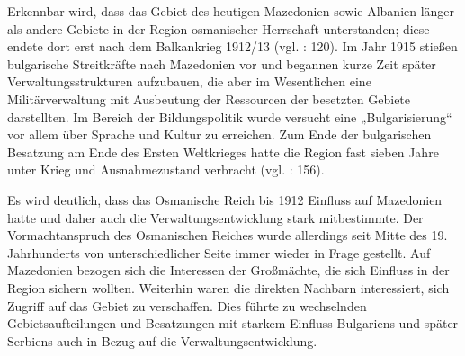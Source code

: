  Erkennbar wird, dass das Gebiet des heutigen Mazedonien sowie Albanien länger als andere Gebiete in der Region osmanischer Herrschaft unterstanden; diese endete dort erst nach dem Balkankrieg 1912/13 (vgl. \cite{batal98}: 120). Im Jahr 1915 stießen bulgarische Streitkräfte nach Mazedonien vor und begannen kurze Zeit später Verwaltungsstrukturen aufzubauen, die aber im Wesentlichen eine Militärverwaltung mit Ausbeutung der Ressourcen der besetzten Gebiete darstellten. Im Bereich der Bildungspolitik wurde versucht eine „Bulgarisierung“ vor allem über Sprache und Kultur zu erreichen. Zum Ende der bulgarischen Besatzung am Ende des Ersten Weltkrieges hatte die Region fast sieben Jahre unter Krieg und Ausnahmezustand verbracht (vgl. \cite{opfer}: 156).\par
Es wird deutlich, dass das Osmanische Reich bis 1912 Einfluss auf Mazedonien hatte und daher auch die Verwaltungsentwicklung stark mitbestimmte. Der Vormachtanspruch des Osmanischen Reiches wurde allerdings seit Mitte des 19. Jahrhunderts von unterschiedlicher Seite immer wieder in Frage gestellt. Auf Mazedonien bezogen sich die Interessen der Großmächte, die sich Einfluss in der Region sichern wollten. Weiterhin waren die direkten Nachbarn interessiert, sich Zugriff auf das Gebiet zu verschaffen. Dies führte zu wechselnden Gebietsaufteilungen und Besatzungen mit starkem Einfluss Bulgariens und später Serbiens auch in Bezug auf die Verwaltungsentwicklung. 





